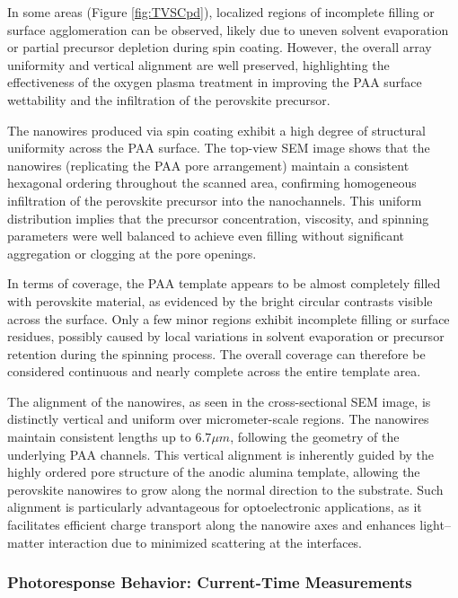 \documentclass{rapportCS}
\begin{document}
	In some areas (Figure \ref{fig:TVSCpd}), localized regions of incomplete filling or surface agglomeration can be observed, likely due to uneven solvent evaporation or partial precursor depletion during spin coating. However, the overall array uniformity and vertical alignment are well preserved, highlighting the effectiveness of the oxygen plasma treatment in improving the PAA surface wettability and the infiltration of the perovskite precursor.
	
	
	The  nanowires produced via spin coating exhibit a high degree of structural uniformity across the PAA surface. The top-view SEM image shows that the nanowires (replicating the PAA pore arrangement) maintain a consistent hexagonal ordering throughout the scanned area, confirming homogeneous infiltration of the perovskite precursor into the nanochannels. This uniform distribution implies that the precursor concentration, viscosity, and spinning parameters were well balanced to achieve even filling without significant aggregation or clogging at the pore openings.
	
	In terms of coverage, the PAA template appears to be almost completely filled with perovskite material, as evidenced by the bright circular contrasts visible across the surface. Only a few minor regions exhibit incomplete filling or surface residues, possibly caused by local variations in solvent evaporation or precursor retention during the spinning process. The overall coverage can therefore be considered continuous and nearly complete across the entire template area.
	
	The alignment of the nanowires, as seen in the cross-sectional SEM image, is distinctly vertical and uniform over micrometer-scale regions. The nanowires maintain consistent lengths up to  $6.7 \mu m$, following the geometry of the underlying PAA channels. This vertical alignment is inherently guided by the highly ordered pore structure of the anodic alumina template, allowing the perovskite nanowires to grow along the normal direction to the substrate. Such alignment is particularly advantageous for optoelectronic applications, as it facilitates efficient charge transport along the nanowire axes and enhances light–matter interaction due to minimized scattering at the interfaces.
	
	\subsubsection{Photoresponse Behavior: Current-Time Measurements}
	
\end{document}
